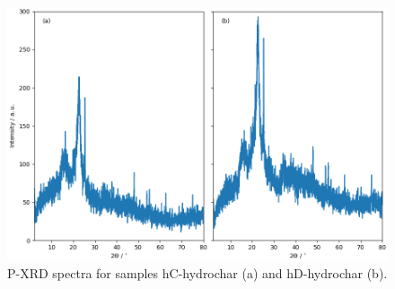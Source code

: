 \cleardoublepage
\begin{subappendices}

\begin{figure}[h]
    \centering
    \includegraphics[width=\columnwidth, keepaspectratio]{4-cbs/figs/xrd_hydrochar.png}
    \caption{P-XRD spectra for samples hC-hydrochar (a) and hD-hydrochar (b).}
    \label{fig:xrd_hydrochar}
\end{figure}


\end{subappendices}
